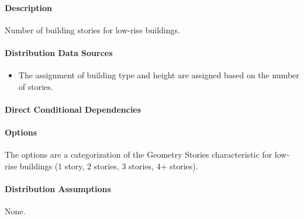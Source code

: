 \paragraph{Description}
% 
Number of building stories for low-rise buildings.

\paragraph{Distribution Data Sources}
% 
\begin{itemize}
    \item The assignment of building type and height are assigned based on the number of stories.
\end{itemize}

\paragraph{Direct Conditional Dependencies}


\paragraph{Options}
The options are a categorization of the Geometry Stories characteristic for low-rise buildings (1 story, 2 stories, 3 stories, 4+ stories).

\paragraph{Distribution Assumptions}
% 
None.
